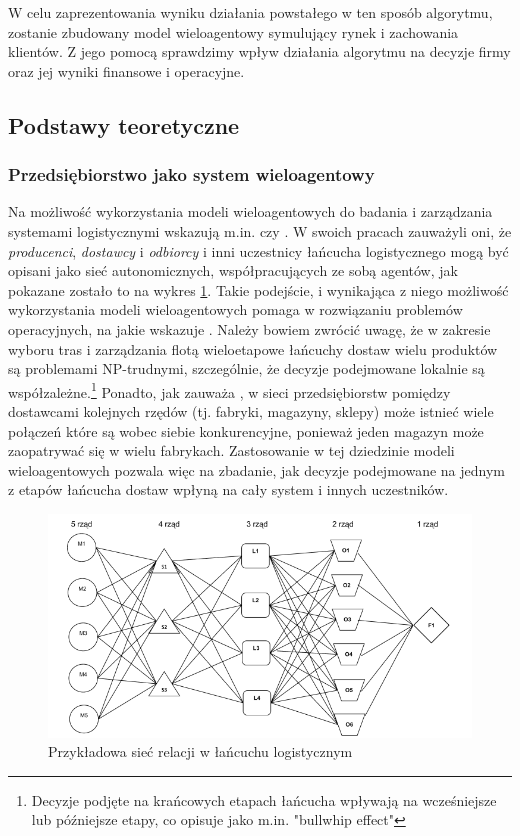 \documentclass[polish, twoside, 12pt, a4paper]{article}
\theoremstyle{definition}
\theoremstyle{plain}
\theoremstyle{remark}
\begin{document}
W celu zaprezentowania wyniku działania powstałego w ten sposób algorytmu, zostanie zbudowany model wieloagentowy symulujący rynek i zachowania klientów. Z jego pomocą sprawdzimy wpływ działania algorytmu na decyzje firmy oraz jej wyniki finansowe i operacyjne.

\subsection{Podstawy teoretyczne} \label{teoria}
\subsubsection{Przedsiębiorstwo jako system wieloagentowy} 
Na możliwość wykorzystania modeli wieloagentowych do badania i zarządzania systemami logistycznymi wskazują m.in. \cite{Moyaux2006} czy \cite{Kawa2010}. W swoich pracach zauważyli oni, że  \textit{producenci},  \textit{dostawcy} i  \textit{odbiorcy} i inni uczestnicy łańcucha logistycznego mogą być opisani jako sieć autonomicznych, współpracujących ze sobą agentów, jak pokazane zostało to na wykres \ref{fig:siecKawa}. Takie podejście, i wynikająca z niego możliwość wykorzystania modeli wieloagentowych pomaga w rozwiązaniu problemów operacyjnych, na jakie wskazuje \cite{Kawa2010}. Należy bowiem zwrócić uwagę, że w zakresie wyboru tras i zarządzania flotą wieloetapowe łańcuchy dostaw wielu produktów są problemami NP-trudnymi, szczególnie, że decyzje podejmowane lokalnie są współzależne.\footnote{Decyzje podjęte na krańcowych etapach łańcucha wpływają na wcześniejsze lub późniejsze etapy, co \cite{Moyaux2006} opisuje jako m.in. "bullwhip effect"} Ponadto, jak zauważa \cite{Kawa2010}, w sieci przedsiębiorstw pomiędzy dostawcami kolejnych rzędów (tj. fabryki, magazyny, sklepy) może istnieć wiele połączeń które są wobec siebie konkurencyjne, ponieważ jeden magazyn może zaopatrywać się w wielu fabrykach. Zastosowanie w tej dziedzinie modeli wieloagentowych pozwala więc na zbadanie, jak decyzje podejmowane na jednym z etapów łańcucha dostaw wpłyną na cały system i innych uczestników.  

\begin{figure}
  \centering
\includegraphics[width=\linewidth]{pictures/siec.png}
  \caption{Przykładowa sieć relacji w łańcuchu logistycznym}
  \label{fig:siecKawa}

\end{figure}
\end{document}
